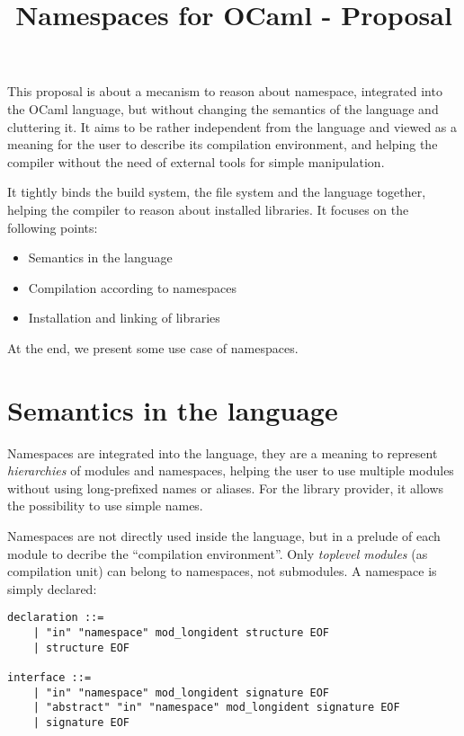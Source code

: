 \documentclass[11pt,a4paper]{article}
\title{Namespaces for OCaml - Proposal}
\begin{document}
\maketitle

This proposal is about a mecanism to reason about namespace, integrated into the
OCaml language, but without changing the semantics of the language and
cluttering it. It aims to be rather independent from the language and viewed as
a meaning for the user to describe its compilation environment, and helping the
compiler without the need of external tools for simple manipulation.

It tightly binds the build system, the file system and the language together,
helping the compiler to reason about installed libraries.
It focuses on the following points:
\begin{itemize}
\item Semantics in the language
\item Compilation according to namespaces
\item Installation and linking of libraries
\end{itemize}

At the end, we present some use case of namespaces.

\section{Semantics in the language}

Namespaces are integrated into the language, they are a meaning to represent
\emph{hierarchies} of modules and namespaces, helping the user to use multiple
modules without using long-prefixed names or aliases. For the library provider,
it allows the possibility to use simple names.

Namespaces are not directly used inside the language, but in a prelude of each
module to decribe the ``compilation environment''. Only \emph{toplevel modules}
(as compilation unit) can belong to namespaces, not submodules. A namespace is
simply declared: 

\begin{verbatim}
declaration ::=
    | "in" "namespace" mod_longident structure EOF
    | structure EOF

interface ::=
    | "in" "namespace" mod_longident signature EOF
    | "abstract" "in" "namespace" mod_longident signature EOF
    | signature EOF
\end{verbatim}
\end{document}
